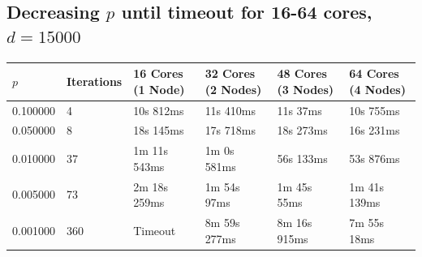 \documentclass[12pt]{article}
\begin{document}
\begin{appendices}
\subsection{Decreasing $p$ until timeout for 16-64 cores, $d=15000$}\vspace{-0.5cm}
\footnotesize{\label{sec:ptimeout}
\begin{center}
\begin{tabular}{|p{2.5cm}|p{2.5cm}|p{2.5cm}|p{2.5cm}|p{2.5cm}|p{2.5cm}|}
\hline
$p$ & Iterations & 16 Cores (1 Node) & 32 Cores (2 Nodes) & 48 Cores (3 Nodes) & 64 Cores (4 Nodes)\\
\hline
0.100000 & 4 & 10s 812ms &	11s 410ms &	11s 37ms &	10s 755ms \\
0.050000 & 8 & 18s 145ms &	17s 718ms &	18s 273ms &	16s 231ms \\
0.010000 & 37 & 1m 11s 543ms &	1m 0s 581ms &	56s 133ms &	53s 876ms \\
0.005000 & 73 & 2m 18s 259ms &	1m 54s 97ms &	1m 45s 55ms &	1m 41s 139ms \\
0.001000 & 360 & Timeout & 8m 59s 277ms &	8m 16s 915ms &	7m 55s 18ms \\
\hline
\end{tabular}
\end{center}}

	
\end{appendices}
\end{document}
